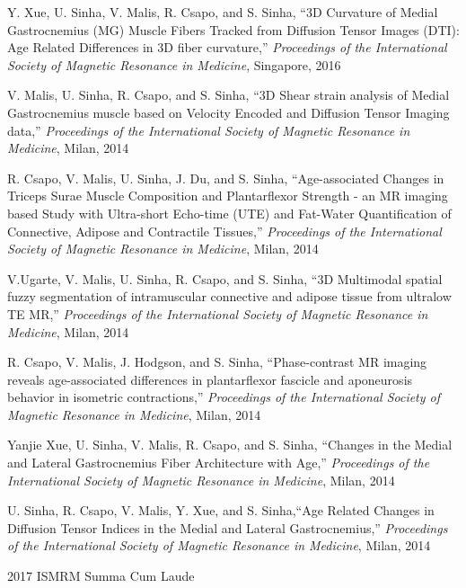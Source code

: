 \begin{frontmatter}
\begin{vitapage}
\begin{talks}
	\item Y. Xue, U. Sinha, V. Malis, R. Csapo, and S. Sinha, ``3D Curvature of Medial Gastrocnemius (MG) Muscle Fibers Tracked from Diffusion Tensor Images (DTI): Age Related Differences in 3D fiber curvature,'' \emph{Proceedings of the International Society of Magnetic Resonance in Medicine}, Singapore, 2016
	\item V. Malis, U. Sinha, R. Csapo, and S. Sinha, ``3D Shear strain analysis of Medial Gastrocnemius muscle based on Velocity Encoded and Diffusion Tensor Imaging data,'' \emph{Proceedings of the International Society of Magnetic Resonance in Medicine}, Milan, 2014
	\item R. Csapo, V. Malis, U. Sinha, J. Du, and S. Sinha, ``Age-associated Changes in Triceps Surae Muscle Composition and Plantarflexor Strength - an MR imaging based Study with Ultra-short Echo-time (UTE) and Fat-Water Quantification of Connective, Adipose and Contractile Tissues,'' \emph{Proceedings of the International Society of Magnetic Resonance in Medicine}, Milan, 2014
	\item V.Ugarte, V. Malis, U. Sinha, R. Csapo, and S. Sinha, ``3D Multimodal spatial fuzzy segmentation of intramuscular connective and adipose tissue from ultralow TE MR,'' \emph{Proceedings of the International Society of Magnetic Resonance in Medicine}, Milan, 2014
	\item R. Csapo, V. Malis, J. Hodgson, and S. Sinha, ``Phase-contrast MR imaging reveals age-associated differences in plantarflexor fascicle and aponeurosis behavior in isometric contractions,'' \emph{Proceedings of the International Society of Magnetic Resonance in Medicine}, Milan, 2014
	\item Yanjie Xue, U. Sinha, V. Malis, R. Csapo, and S. Sinha, ``Changes in the Medial and Lateral Gastrocnemius Fiber Architecture with Age,'' \emph{Proceedings of the International Society of Magnetic Resonance in Medicine}, Milan, 2014
	\item U. Sinha, R. Csapo, V. Malis, Y. Xue, and S. Sinha,``Age Related Changes in Diffusion Tensor Indices in the Medial and Lateral Gastrocnemius,'' \emph{Proceedings of the International Society of Magnetic Resonance in Medicine}, Milan, 2014

\end{talks}

\begin{awards}
	\item 2017 ISMRM Summa Cum Laude	
\end{awards}



\end{vitapage}
\end{frontmatter}
